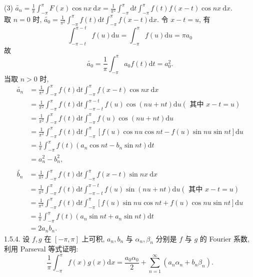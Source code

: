 \documentclass[a4paper,11pt,UTF8]{article}
\begin{document}
(3) $\displaystyle \widetilde{a_n}=\frac{1}{\pi} \int_{-\pi}^\pi F(x) \cos n x \mathrm{~d} x=\frac{1}{\pi^2} \int_{-\pi}^\pi \mathrm{d} t \int_{-\pi}^\pi f(t) f(x-t) \cos n x \mathrm{~d} x$.\\
取 $n=0$ 时, $\displaystyle \widetilde{a_0}=\frac{1}{\pi^2} \int_{-\pi}^\pi f(t) \mathrm{d} t \int_{-\pi}^\pi f(x-t) \mathrm{d} x$. 令 $x-t=u$, 有
$$
\int_{-\pi-t}^{\pi-t} f(u) \mathrm{d} u=\int_{-\pi}^\pi f(u) \mathrm{d} u=\pi a_0
$$
故
$$
\widetilde{a_0}=\frac{1}{\pi} \int_{-\pi}^\pi a_0 f(t) \mathrm{d} t=a_0^2 .
$$
当取 $n>0$ 时,
$$
\begin{aligned}
	\widetilde{a_n} & =\frac{1}{\pi^2} \int_{-\pi}^\pi f(t) \mathrm{d} t \int_{-\pi}^\pi f(x-t) \cos n x \mathrm{~d} x \\
	& =\frac{1}{\pi^2} \int_{-\pi}^\pi f(t) \mathrm{d} t \int_{-\pi-t}^{\pi-t} f(u) \cos (n u+n t) \mathrm{d} u(\text { 其中 } x-t=u) \\
	& =\frac{1}{\pi^2} \int_{-\pi}^\pi f(t) \mathrm{d} t \int_{-\pi}^\pi f(u) \cos (n u+n t) \mathrm{d} u \\
	& =\frac{1}{\pi^2} \int_{-\pi}^\pi f(t) \mathrm{d} t \int_{-\pi}^\pi[f(u) \cos n u \cos n t-f(u) \sin n u \sin n t] \mathrm{d} u \\
	& =\frac{1}{\pi} \int_{-\pi}^\pi f(t)\left(a_n \cos n t-b_n \sin n t\right) \mathrm{d} t \\
	& =a_n^2-b_n^2, \\
\end{aligned}
$$
$$
\begin{aligned}
	\tilde{b_n} & =\frac{1}{\pi^2} \int_{-\pi}^\pi f(t) \mathrm{d} t \int_{-\pi}^\pi f(x-t) \sin n x \mathrm{~d} x \\
	& =\frac{1}{\pi^2} \int_{-\pi}^\pi f(t) \mathrm{d} t \int_{-\pi-t}^{\pi-t} f(u) \sin (n u+n t) \mathrm{d} u(\text { 其中 } x-t=u)\\
	& =\frac{1}{\pi^2} \int_{-\pi}^\pi f(t) \mathrm{d} t \int_{-\pi}^\pi[f(u) \sin n u \cos n t+f(u) \cos n u \sin n t] \mathrm{d} u \\
	& =\frac{1}{\pi} \int_{-\pi}^\pi f(t)\left(a_n \sin n t+a_n \sin n t\right) \mathrm{d} t \\
	& =2 a_n b_n .
\end{aligned}
$$
1.5.4. 设 $\displaystyle f, g$ 在 $[-\pi, \pi]$ 上可积, $a_n, b_n$ 与 $\displaystyle \alpha_n, \beta_n$ 分别是 $\displaystyle f$ 与 $g$ 的 Fourier 系数, 利用 Parseval 等式证明:
$$
\frac{1}{\pi} \int_{-\pi}^\pi f(x) g(x) \mathrm{d} x=\frac{a_0 \alpha_0}{2}+\sum_{n=1}^{\infty}\left(a_n \alpha_n+b_n \beta_n\right) .
$$
\end{document}
